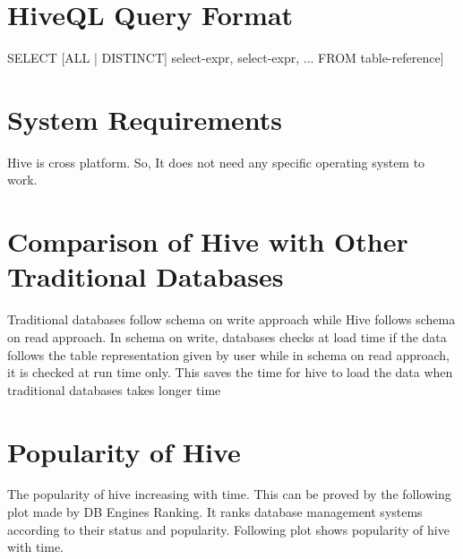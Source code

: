 \documentclass[9pt,twocolumn,twoside]{../../styles/osajnl}
\begin{document}
\section{HiveQL Query Format}
SELECT [ALL | DISTINCT] select-expr, select-expr, ...\newline
FROM table-reference\newline
[CLUSTER BY col-list | [DISTRIBUTE BY col-list] [SORT BY col-list]]\newline
\cite{p1}\newline


\section{System Requirements}
Hive is cross platform. So, It does not need any specific operating system to work.


\section{Comparison of Hive with Other Traditional Databases}
Traditional databases follow schema on write approach while Hive follows schema on read approach. In schema on write, databases checks at load time if the data follows the table representation given by user while in schema on read approach, it is checked at run time only. This saves the time for hive to load the data when traditional databases takes longer time\cite{p2}


\section{Popularity of Hive}
The popularity of hive increasing with time. This can be proved by the following plot made by DB Engines Ranking. It ranks database management systems according to their status and popularity.
Following plot shows popularity of hive with time. 
\end{document}
